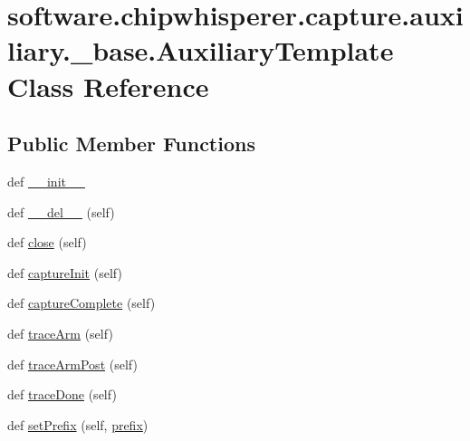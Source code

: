 \hypertarget{classsoftware_1_1chipwhisperer_1_1capture_1_1auxiliary_1_1__base_1_1AuxiliaryTemplate}{}\section{software.\+chipwhisperer.\+capture.\+auxiliary.\+\_\+base.\+Auxiliary\+Template Class Reference}
\label{classsoftware_1_1chipwhisperer_1_1capture_1_1auxiliary_1_1__base_1_1AuxiliaryTemplate}
\subsection*{Public Member Functions}
\begin{DoxyCompactItemize}
\item 
def \hyperlink{classsoftware_1_1chipwhisperer_1_1capture_1_1auxiliary_1_1__base_1_1AuxiliaryTemplate_a65bfd22743667c9f5883d59ecc2be6a6}{\+\_\+\+\_\+init\+\_\+\+\_\+}
\item 
def \hyperlink{classsoftware_1_1chipwhisperer_1_1capture_1_1auxiliary_1_1__base_1_1AuxiliaryTemplate_a745fcabc4e42dc688bfc127b108fd18c}{\+\_\+\+\_\+del\+\_\+\+\_\+} (self)
\item 
def \hyperlink{classsoftware_1_1chipwhisperer_1_1capture_1_1auxiliary_1_1__base_1_1AuxiliaryTemplate_abfa545a9f23865c68d48f7e5435da2c6}{close} (self)
\item 
def \hyperlink{classsoftware_1_1chipwhisperer_1_1capture_1_1auxiliary_1_1__base_1_1AuxiliaryTemplate_ae3d02300742cc5e8ad93afb089151247}{capture\+Init} (self)
\item 
def \hyperlink{classsoftware_1_1chipwhisperer_1_1capture_1_1auxiliary_1_1__base_1_1AuxiliaryTemplate_add637bbb089bc8852dc2cec04280617d}{capture\+Complete} (self)
\item 
def \hyperlink{classsoftware_1_1chipwhisperer_1_1capture_1_1auxiliary_1_1__base_1_1AuxiliaryTemplate_ad3efebe0485c2595acbdc4fb9e490f80}{trace\+Arm} (self)
\item 
def \hyperlink{classsoftware_1_1chipwhisperer_1_1capture_1_1auxiliary_1_1__base_1_1AuxiliaryTemplate_a9f129243cc4b412c658bfcdb37afa904}{trace\+Arm\+Post} (self)
\item 
def \hyperlink{classsoftware_1_1chipwhisperer_1_1capture_1_1auxiliary_1_1__base_1_1AuxiliaryTemplate_a3df362298154c3a65eb704068cee23f6}{trace\+Done} (self)
\item 
def \hyperlink{classsoftware_1_1chipwhisperer_1_1capture_1_1auxiliary_1_1__base_1_1AuxiliaryTemplate_a23f56fed7dc9534b1a9f88c99bf78473}{set\+Prefix} (self, \hyperlink{classsoftware_1_1chipwhisperer_1_1capture_1_1auxiliary_1_1__base_1_1AuxiliaryTemplate_a6810b1e3125868f572ae5f2b77e4da7e}{prefix})
\end{DoxyCompactItemize}
